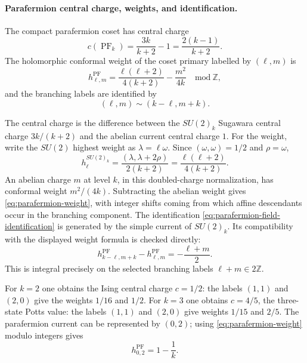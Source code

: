\paragraph{Parafermion central charge, weights, and identification.}
The compact parafermion coset has central charge
\begin{equation}
  c(\operatorname{PF}_k)
  =
  \frac{3k}{k+2}-1
  =
  \frac{2(k-1)}{k+2}.
  \label{eq:parafermion-central-charge}
\end{equation}
The holomorphic conformal weight of the coset primary labelled by
\((\ell,m)\) is
\begin{equation}
  h^{\operatorname{PF}}_{\ell,m}
  =
  \frac{\ell(\ell+2)}{4(k+2)}
  -
  \frac{m^2}{4k}
  \quad \mathrm{mod}\ \mathbb Z ,
  \label{eq:parafermion-weight}
\end{equation}
and the branching labels are identified by
\begin{equation}
  (\ell,m)\sim(k-\ell,m+k).
  \label{eq:parafermion-field-identification}
\end{equation}

The central charge is the difference between the \(SU(2)_k\) Sugawara
central charge \(3k/(k+2)\) and the abelian current central charge \(1\).
For the weight, write the \(SU(2)\) highest weight as \(\lambda=\ell\omega\).
Since \((\omega,\omega)=1/2\) and \(\rho=\omega\),
\[
  h^{SU(2)_k}_{\ell}
  =
  \frac{(\lambda,\lambda+2\rho)}{2(k+2)}
  =
  \frac{\ell(\ell+2)}{4(k+2)}.
\]
An abelian charge \(m\) at level \(k\), in this doubled-charge
normalization, has conformal weight \(m^2/(4k)\).  Subtracting the abelian
weight gives \eqref{eq:parafermion-weight}, with integer shifts coming from
which affine descendants occur in the branching component.  The
identification \eqref{eq:parafermion-field-identification} is generated by
the simple current of \(SU(2)_k\).  Its compatibility with the displayed
weight formula is checked directly:
\[
  h^{\operatorname{PF}}_{k-\ell,m+k}-h^{\operatorname{PF}}_{\ell,m}
  =
  -\frac{\ell+m}{2}.
\]
This is integral precisely on the selected branching labels
\(\ell+m\in2\mathbb Z\).

For \(k=2\) one obtains the Ising central charge \(c=1/2\): the labels
\((1,1)\) and \((2,0)\) give the weights \(1/16\) and \(1/2\).  For \(k=3\)
one obtains \(c=4/5\), the three-state Potts value: the labels \((1,1)\)
and \((2,0)\) give weights \(1/15\) and \(2/5\).  The parafermion current
can be represented by \((0,2)\); using
\eqref{eq:parafermion-weight} modulo integers gives
\[
  h_{0,2}^{\operatorname{PF}}=1-\frac1k .
\]

